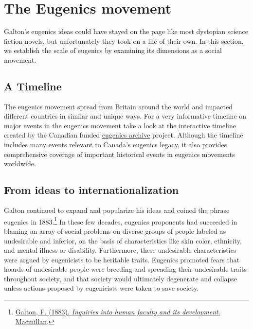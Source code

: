 \documentclass[
  oneside,
  12pt]{crumpbook}
\begin{document}
\hypertarget{the-eugenics-movement}{%
\section{The Eugenics movement}\label{the-eugenics-movement}}

Galton's eugenics ideas could have stayed on the page like most dystopian science fiction novels, but unfortunately they took on a life of their own. In this section, we establish the scale of eugenics by examining its dimensions as a social movement.

\hypertarget{a-timeline}{%
\subsection{A Timeline}\label{a-timeline}}

The eugenics movement spread from Britain around the world and impacted different countries in similar and unique ways. For a very informative timeline on major events in the eugenics movement take a look at the \href{https://eugenicsarchive.ca/discover/timeline}{interactive timeline} created by the Canadian funded \href{https://eugenicsarchive.ca/}{eugenics archive} project. Although the timeline includes many events relevant to Canada's eugenics legacy, it also provides comprehensive coverage of important historical events in eugenics movements worldwide.

\hypertarget{from-ideas-to-internationalization}{%
\subsection{From ideas to internationalization}\label{from-ideas-to-internationalization}}

Galton continued to expand and popularize his ideas and coined the phrase eugenics in 1883.\footnote{\protect\hyperlink{ref-galtonInquiriesHumanFaculty1883}{Galton, F. (1883). \emph{Inquiries into human faculty and its development}. {Macmillan}}.} In these few decades, eugenics proponents had succeeded in blaming an array of social problems on diverse groups of people labeled as undesirable and inferior, on the basis of characteristics like skin color, ethnicity, and mental illness or disability. Furthermore, these undesirable characteristics were argued by eugenicists to be heritable traits. Eugenics promoted fears that hoards of undesirable people were breeding and spreading their undesirable traits throughout society, and that society would ultimately degenerate and collapse unless actions proposed by eugenicists were taken to save society.
\end{document}
